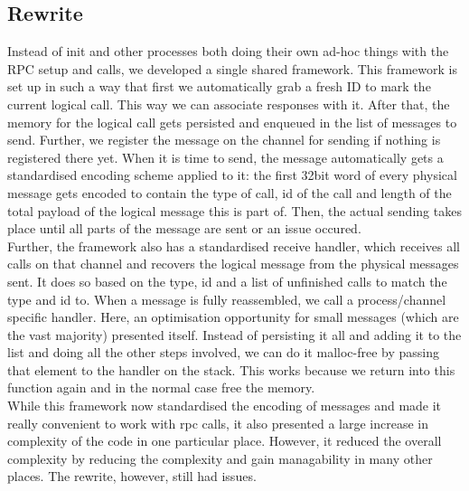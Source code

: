 \subsection{Rewrite}
Instead of init and other processes both doing their own ad-hoc things with 
the RPC setup and calls, we developed a single shared framework.
This framework is set up in such a way that first we automatically grab a fresh ID to 
mark the current logical call. This way we can associate responses with it. After that, the memory for the logical call gets persisted and enqueued in the list of 
messages to send. Further, we register the message on the channel for sending if 
nothing is registered there yet.  
When it is time to send, the message automatically gets a standardised encoding 
scheme applied to it: the first 32bit word of every physical message gets 
encoded to contain the type of call, id of the call and length of the total 
payload of the logical message this is part of. Then, the actual sending takes 
place until all parts of the message are sent or an issue occured.\\

\medskip
Further, the framework also has a standardised receive handler, which receives 
all calls on that channel and recovers the logical message from the physical 
messages sent. It does so based on the type, id and a list of  
unfinished calls to match the type and id to. 
When a message is fully reassembled, we call a process/channel specific handler. Here, an optimisation opportunity for small 
messages (which are the vast majority) presented itself. Instead of 
persisting it all and adding it to the list and doing all the other steps involved, we can do it malloc-free by passing that element to the handler on the stack. This works because we return into this function again and in the normal case free the memory.\\

\medskip
While this framework now standardised the encoding of messages and made it 
really convenient to work with rpc calls, it also presented a large increase in complexity of the code in one 
particular place. However, it reduced the overall complexity by reducing the complexity and gain managability in many other places.
The rewrite, however, still had issues. 

